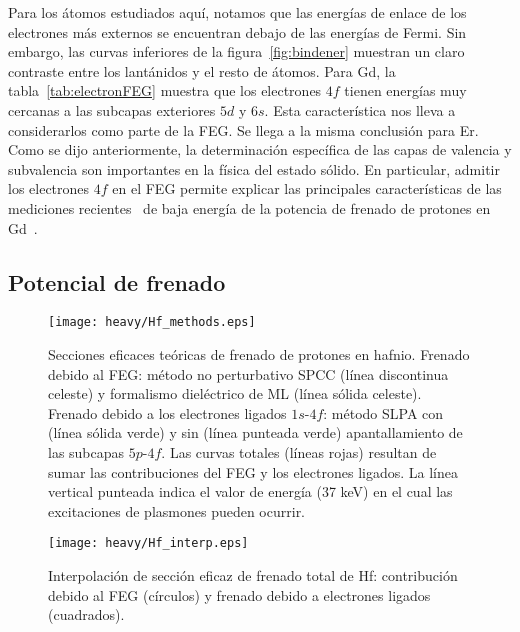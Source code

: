 Para los átomos estudiados aquí, notamos que las energías de enlace de 
los electrones más externos se encuentran debajo de las energías de 
Fermi. Sin embargo, las curvas inferiores de la figura~\ref{fig:bindener} 
muestran un claro contraste entre los lantánidos y el resto de átomos. 
Para Gd, la tabla~\ref{tab:electronFEG} muestra que los electrones $4f$ 
tienen energías muy cercanas a las subcapas exteriores $5d$ y $6s$. Esta 
característica nos lleva a considerarlos como parte de la FEG. Se llega 
a la misma conclusión para Er. Como se dijo anteriormente, la 
determinación específica de las capas de valencia y subvalencia son 
importantes en la física del estado sólido. En particular, admitir los 
electrones $4f$ en el FEG permite explicar las principales características 
de las mediciones recientes~\cite{Montanari:17,Montanari:19} de baja 
energía de la potencia de frenado de protones en Gd~\cite{Roth:17}.


\subsection{Potencial de frenado}
\label{subsec:results-stopping}


\begin{figure}[H]
\centering
\texttt{[image: heavy/Hf\_methods.eps]}
\caption[Secciones eficaces teóricas de frenado de protones en Hf.]
{Secciones eficaces teóricas de frenado de protones en hafnio.
Frenado debido al FEG: método no perturbativo SPCC (línea discontinua 
celeste) y formalismo dieléctrico de ML (línea sólida celeste). 
Frenado debido a los electrones ligados $1s$-$4f$: método SLPA con (línea 
sólida verde) y sin (línea punteada verde) apantallamiento de las 
subcapas $5p$-$4f$. 
Las curvas totales (líneas rojas) resultan de sumar las contribuciones 
del FEG y los electrones ligados. 
La línea vertical punteada indica el valor de energía (37 keV) en el cual 
las excitaciones de plasmones pueden ocurrir.} 
\label{fig:Hf_methods}
\end{figure}

\begin{figure}[H]
\centering
\texttt{[image: heavy/Hf\_interp.eps]}
\caption[Interpolación de sección eficaz de frenado total.]
{Interpolación de sección eficaz de frenado total de Hf: contribución 
debido al FEG (círculos) y frenado debido a electrones ligados 
(cuadrados).} 
\label{fig:Hf_interp}
\end{figure}

